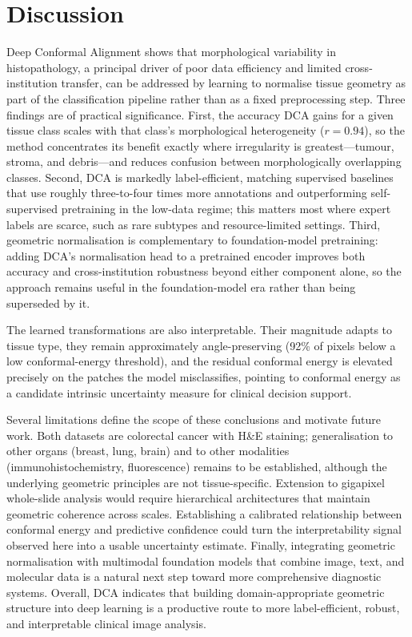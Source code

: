 
\section{Discussion}
\label{sec:discussion}

Deep Conformal Alignment shows that morphological variability in histopathology,
a principal driver of poor data efficiency and limited cross-institution
transfer, can be addressed by learning to normalise tissue geometry as part of
the classification pipeline rather than as a fixed preprocessing step. Three
findings are of practical significance. First, the accuracy DCA gains for a given
tissue class scales with that class's morphological heterogeneity
($r=0.94$), so the method concentrates its benefit exactly where irregularity is
greatest---tumour, stroma, and debris---and reduces confusion between
morphologically overlapping classes. Second, DCA is markedly label-efficient,
matching supervised baselines that use roughly three-to-four times more
annotations and outperforming self-supervised pretraining in the low-data regime;
this matters most where expert labels are scarce, such as rare subtypes and
resource-limited settings. Third, geometric normalisation is complementary to
foundation-model pretraining: adding DCA's normalisation head to a pretrained
encoder improves both accuracy and cross-institution robustness beyond either
component alone, so the approach remains useful in the foundation-model era rather
than being superseded by it.

The learned transformations are also interpretable. Their magnitude adapts to
tissue type, they remain approximately angle-preserving (92\% of pixels below a
low conformal-energy threshold), and the residual conformal energy is elevated
precisely on the patches the model misclassifies, pointing to conformal energy as
a candidate intrinsic uncertainty measure for clinical decision support.

Several limitations define the scope of these conclusions and motivate future
work. Both datasets are colorectal cancer with H\&E staining; generalisation to
other organs (breast, lung, brain) and to other modalities (immunohistochemistry,
fluorescence) remains to be established, although the underlying geometric
principles are not tissue-specific. Extension to gigapixel whole-slide analysis
would require hierarchical architectures that maintain geometric coherence across
scales. Establishing a calibrated relationship between conformal energy and
predictive confidence could turn the interpretability signal observed here into a
usable uncertainty estimate. Finally, integrating geometric normalisation with
multimodal foundation models that combine image, text, and molecular data is a
natural next step toward more comprehensive diagnostic systems. Overall, DCA
indicates that building domain-appropriate geometric structure into deep learning
is a productive route to more label-efficient, robust, and interpretable clinical
image analysis.
